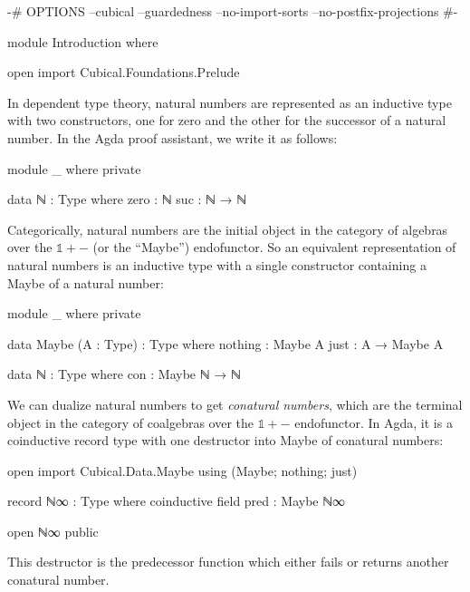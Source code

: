 \begin{code}[hide]
{-# OPTIONS --cubical --guardedness --no-import-sorts --no-postfix-projections #-}

module Introduction where

open import Cubical.Foundations.Prelude
\end{code}
In dependent type theory, natural numbers are represented as an inductive type
with two constructors, one for zero and the other for the successor of a natural
number. In the Agda proof assistant, we write it as follows:
\begin{code}[hide]
module _ where private
\end{code}
\begin{code}
  data ℕ : Type where
    zero  :      ℕ
    suc   : ℕ →  ℕ
\end{code}
Categorically, natural numbers are the initial object in the category of
algebras over the $\mathbb{1} + {-}$ (or the ``Maybe'') endofunctor. So an
equivalent representation of natural numbers is an inductive type with a single
constructor containing a Maybe of a natural number:
\begin{code}[hide]
module _ where private
\end{code}
\begin{code}
  data Maybe (A : Type) : Type where
    nothing  :      Maybe A
    just     : A →  Maybe A

  data ℕ : Type where
    con : Maybe ℕ → ℕ
\end{code}

We can dualize natural numbers to get \emph{conatural numbers}, which are the
terminal object in the category of coalgebras over the $\mathbb{1} + {-}$
endofunctor. In Agda, it is a coinductive record type with one destructor into
Maybe of conatural numbers:
\begin{code}[hide]
open import Cubical.Data.Maybe using (Maybe; nothing; just)
\end{code}
\begin{code}
record ℕ∞ : Type where
  coinductive
  field
    pred : Maybe ℕ∞
\end{code}
\begin{code}[hide]
open ℕ∞ public
\end{code}
This destructor is the predecessor function which either fails or returns
another conatural number.

